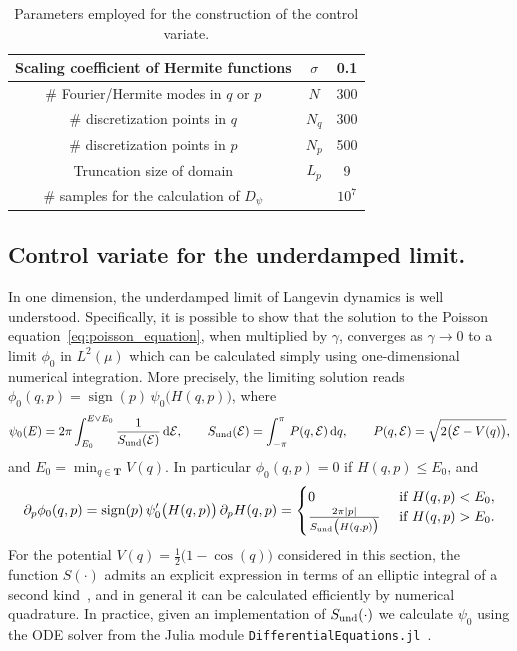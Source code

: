 \documentclass[11pt,a4paper]{article}
\DeclareMathOperator{\sign}{sign}
\newcommand{\torus}{\mathbf T}
\renewcommand{\d}{\mathrm d}
\theoremstyle{plain}
\numberwithin{equation}{section}
\renewcommand{\leq}{\leqslant}
\begin{document}
\begin{table}[ht]
    \centering
    \begin{tabular}{|c|c|c|}
        \hline
        Scaling coefficient of Hermite functions & $\sigma$ & 0.1 \\
        \hline
        \# Fourier/Hermite modes in $q$ or $p$ & $N$ & 300 \\
        \hline
        \# discretization points in $q$ & $N_q$ & 300 \\
        \hline
        \# discretization points in $p$ & $N_p$ & 500 \\
        \hline
        Truncation size of domain & $L_p$ & 9 \\
        \hline
        \# samples for the calculation of $D_{\psi}$ & & $10^7$ \\
        \hline
    \end{tabular}
    \caption{Parameters employed for the construction of the control variate.}
    \label{table:parameters_employed_for_the_construction_of_the_control_variate}
\end{table}

\subsection{Control variate for the underdamped limit.}%
\label{sub:underdamped_approach}
In one dimension,
the underdamped limit of Langevin dynamics is well understood.
Specifically, it is possible to show that the solution to the Poisson equation~\eqref{eq:poisson_equation},
when multiplied by $\gamma$,
converges as $\gamma \to 0$ to a limit $\phi_0$ in $L^2(\mu)$ which can be calculated simply using one-dimensional numerical integration.
More precisely,
the limiting solution reads $\phi_0(q,p) = \sign(p) \, \psi_0\bigl(H(q,p)\bigr)$,
where
\[
    \psi_0(E) = 2 \pi \int_{E_0}^{E \vee E_0} \frac{1}{S_{\rm und}(\mathcal E)} \, \d \mathcal E,
    \qquad S_{\rm und}(\mathcal E) = \int_{-\pi}^{\pi} P(q, \mathcal E) \, \d q, \qquad P(q, \mathcal E) = \sqrt {2 \bigl(\mathcal E - V(q)\bigr)},
\]
and $E_0 = \min_{q \in \torus} V(q)$.
In particular $\phi_0(q,p) = 0$ if $H(q,p) \leq E_0$,
and
\[
    \partial_p \phi_0(q, p)
    = \sign(p) \, \psi_0'\bigl(H(q,p)\bigr) \, \partial_p H(q,p)
    =
    \begin{cases}
        0 & \text{ if $H(q,p) < E_0$}, \\
        \frac{2 \pi \abs{p}}{S_{\rm und}\bigl(H(q,p)\bigr)} & \text{ if $H(q,p) > E_0$}.
    \end{cases}
\]
For the potential $V(q) = \frac{1}{2} \bigl(1 - \cos(q)\bigr)$ considered in this section,
the function $S(\cdot)$ admits an explicit expression in terms of an elliptic integral of a second kind~\cite{MR2427108},
and in general it can be calculated efficiently by numerical quadrature.
In practice, given an implementation of $S_{\rm und}(\cdot)$ we calculate $\psi_0$ using the ODE solver from the Julia module \texttt{DifferentialEquations.jl}~\cite{rackauckas2017differentialequations}.
\end{document}
